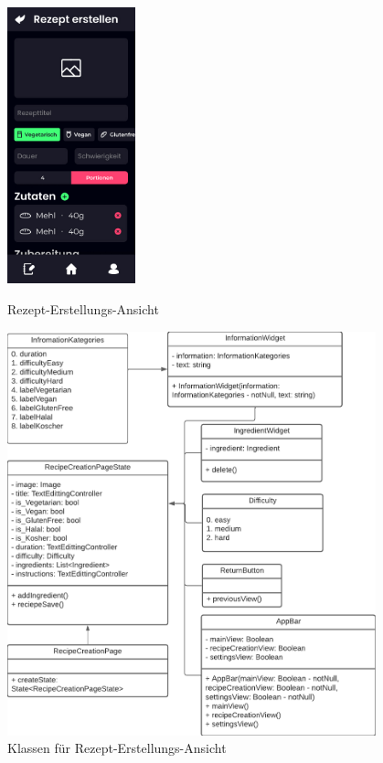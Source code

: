 \documentclass[parskip=full]{scrartcl}
\begin{document}
\begin{figure}[htp]
    \begin{minipage}
        [t]{0.49\textwidth}
        \centering
        \includegraphics[height=80mm]{images/Presentation-layer/RecipeCreationView.jpg}
        \caption{Rezept-Erstellungs-Ansicht}
    \end{minipage}
    \begin{minipage}
        [t]{0.49\textwidth}
        \centering
        \includegraphics[width=0.95\textwidth]{images/Presentation-layer/RecipeCreationViewClass.pdf}
        \caption{Klassen für Rezept-Erstellungs-Ansicht}
    \end{minipage}
\end{figure}
\end{document}
